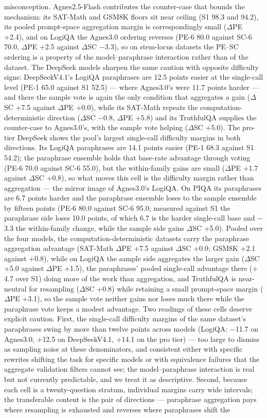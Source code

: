 misconception. Agnes2.5-Flash contributes the counter-case that bounds the mechanism: its SAT-Math and GSM8K floors sit near ceiling (S1 98.3 and 94.2), its pooled prompt-space aggregation margin is correspondingly small ($\Delta$PE +2.4), and on LogiQA the Agnes3.0 ordering reverses (PE-6 80.0 against SC-6 70.0, $\Delta$PE +2.5 against $\Delta$SC $-$3.3), so on stem-locus datasets the PE--SC ordering is a property of the model--paraphrase interaction rather than of the dataset. The DeepSeek models sharpen the same caution with opposite difficulty signs: DeepSeekV4.1's LogiQA paraphrases are 12.5 points easier at the single-call level (PE-1 65.0 against S1 52.5) --- where Agnes3.0's were 11.7 points harder --- and there the sample vote is again the only condition that aggregates a gain ($\Delta$SC +7.5 against $\Delta$PE +0.0), while its SAT-Math repeats the computation-deterministic direction ($\Delta$SC $-$0.8, $\Delta$PE +5.8) and its TruthfulQA supplies the counter-case to Agnes3.0's, with the sample vote helping ($\Delta$SC +5.0). The pro-tier DeepSeek shows the pool's largest single-call difficulty margins in both directions. Its LogiQA paraphrases are 14.1 points easier (PE-1 68.3 against S1 54.2); the paraphrase ensemble holds that base-rate advantage through voting (PE-6 70.0 against SC-6 55.0), but the within-family gains are small ($\Delta$PE +1.7 against $\Delta$SC +0.8), so what moves this cell is the difficulty margin rather than aggregation --- the mirror image of Agnes3.0's LogiQA. On PIQA its paraphrases are 6.7 points harder and the paraphrase ensemble loses to the sample ensemble by fifteen points (PE-6 80.0 against SC-6 95.0; measured against S1 the paraphrase side loses 10.0 points, of which 6.7 is the harder single-call base and $-$3.3 the within-family change, while the sample side gains $\Delta$SC +5.0). Pooled over the four models, the computation-deterministic datasets carry the paraphrase aggregation advantage (SAT-Math $\Delta$PE +7.5 against $\Delta$SC +0.0; GSM8K +2.1 against +0.8), while on LogiQA the sample side aggregates the larger gain ($\Delta$SC +5.0 against $\Delta$PE +1.5), the paraphrases' pooled single-call advantage there ($+$4.7 over S1) doing more of the work than aggregation, and TruthfulQA is near-neutral for resampling ($\Delta$SC +0.8) while retaining a small prompt-space margin ($\Delta$PE +3.1), so the sample vote neither gains nor loses much there while the paraphrase vote keeps a modest advantage. Two readings of these cells deserve explicit caution. First, the single-call difficulty margins of the same dataset's paraphrases swing by more than twelve points across models (LogiQA: $-$11.7 on Agnes3.0, $+$12.5 on DeepSeekV4.1, $+$14.1 on the pro tier) --- too large to dismiss as sampling noise at these denominators, and consistent either with specific rewrites shifting the task for specific models or with equivalence failures that the aggregate validation filters cannot see; the model--paraphrase interaction is real but not currently predictable, and we treat it as descriptive. Second, because each cell is a twenty-question stratum, individual margins carry wide intervals; the transferable content is the pair of directions --- paraphrase aggregation pays where resampling is exhausted and reverses where paraphrases shift the 